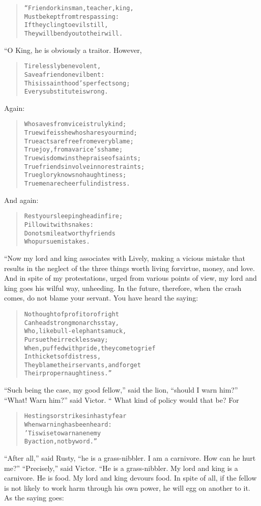 \documentclass[article, twoside, 10pt]{memoir}
\renewenvironment{verbatim}{%
\begin{quote}%
\vskip -10pt%
\begin{alltt}\normalfont\small}{\end{alltt}%
\end{quote}%
\vskip -10pt
} %
\begin{document}
\begin{verbatim}
“Friend or kinsman, teacher, king,
Must be kept from trespassing:
If they cling to evil still,
They will bend you to their will.
\end{verbatim}
“O King, he is obviously a traitor. However,

\begin{verbatim}
Tirelessly benevolent,
Save a friend on evil bent:
This is sainthood's perfect song;
Every substitute is wrong.
\end{verbatim}
Again:

\begin{verbatim}
Who saves from vice is truly kind;
True wife is she who shares your mind;
True acts are free from every blame;
True joy, from avarice's shame;
True wisdom wins the praise of saints;
True friends involve in no restraints;
True glory knows no haughtiness;
True men are cheerful in distress.
\end{verbatim}
And again:

\begin{verbatim}
Rest your sleeping head in fire;
Pillow it with snakes:
Do not smile at worthy friends
Who pursue mistakes.
\end{verbatim}
“Now my lord and king associates with Lively, making a vicious
mistake that results in the neglect of the three things worth
living for{\textemdash}virtue, money, and love. And in spite of my
protestations, urged from various points of view, my lord and king
goes his wilful way, unheeding. In the future, therefore, when the
crash comes, do not blame your servant. You have heard the saying:

\begin{verbatim}
No thought of profit or of right
    Can headstrong monarchs stay,
Who, like bull-elephants amuck,
    Pursue their reckless way;
When, puffed with pride, they come to grief
    In thickets of distress,
They blame their servants, and forget
    Their proper naughtiness.”
\end{verbatim}
``Such being the case, my good fellow,'' said the lion,
``should I warn him?'' ``What! Warn him?'' said Victor. “ What kind
of policy would that be? For

\begin{verbatim}
He stings or strikes in hasty fear
    When warning has been heard:
'Tis wise to warn an enemy
    By action, not by word.”
\end{verbatim}
``After all,'' said Rusty,
``he is a grass-nibbler. I am a carnivore. How can he hurt me?''
``Precisely,'' said Victor. “He is a grass-nibbler. My lord and
king is a carnivore. He is food. My lord and king devours food. In
spite of all, if the fellow is not likely to work harm through his
own power, he will egg on another to it. As the saying goes:
\end{document}
